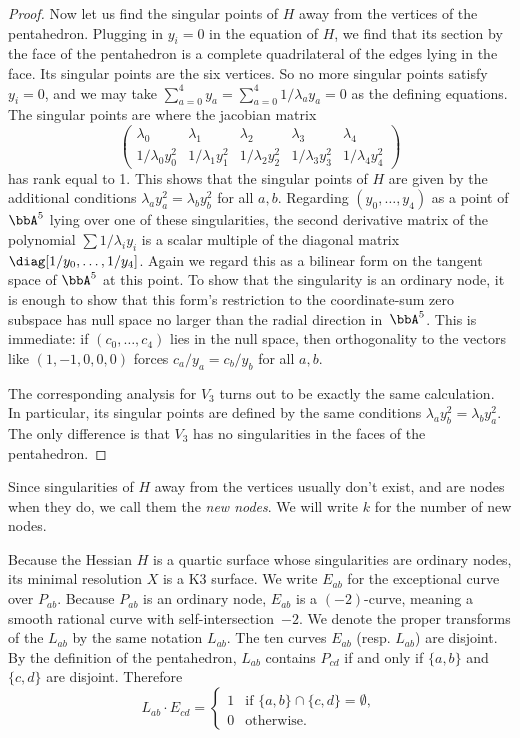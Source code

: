\begin{proof}
Now let us find the singular points of $H$ away from the vertices of the pentahedron. Plugging in $y_i = 0$ in the equation of $H$, we find that its section by the face of the pentahedron is a complete quadrilateral of the edges lying in the face. Its singular points are the six vertices. So no more singular points satisfy $y_i = 0$, and we may take $\sum_{a=0}^4y_a=\sum_{a=0}^4 1/\lambda_ay_a=0$ as the defining equations. The singular points are where the jacobian matrix
\[
\begin{pmatrix}
\lambda_0&\lambda_1&\lambda_2&\lambda_3&\lambda_4
\\
1/\lambda_0y_0^2&1/\lambda_1y_1^2&1/\lambda_2y_2^2&1/\lambda_3y_3^2&1/\lambda_4y_4^2
\end{pmatrix}
\]
has rank equal to 1. This shows that the singular points of $H$ are given by the additional conditions $\lambda_ay_a^2=\lambda_by_b^2$ for all $a,b$. Regarding $(y_0,\dots,y_4)$ as a point of $\bbA^5$ lying over one of these singularities, the second derivative matrix of the polynomial $\sum 1/\lambda_iy_i$ is a scalar multiple of the diagonal matrix $\diag[1/y_0,\dots,1/y_4]$. Again we regard this as a bilinear form on the tangent space of $\bbA^5$ at this point. To show that the singularity is an ordinary node, it is enough to show that this form's restriction to the coordinate-sum zero subspace has null space no larger than the radial direction in~$\bbA^5$. This is immediate: if $(c_0,\dots,c_4)$ lies in the null space, then orthogonality to the vectors like $(1,-1,0,0,0)$ forces $c_a/y_a=c_b/y_b$ for all $a,b$.

The corresponding analysis for $V_3$ turns out to be exactly the same calculation. In particular, its singular points are defined by the same conditions $\lambda_ay_b^2=\lambda_by_a^2$. The only difference is that $V_3$ has no singularities in the faces of the pentahedron.
\end{proof}

Since singularities of $H$ away from the vertices usually don't exist, and are nodes when they do, we call them the \emph{new nodes}. We will write $k$ for the number of new nodes.

Because the Hessian $H$ is a quartic surface whose singularities are ordinary nodes, its minimal resolution $X$ is a K3 surface. We write $E_{ab}$ for the exceptional curve over $P_{ab}$. Because $P_{ab}$ is an ordinary node, $E_{ab}$ is a $(-2)$-curve, meaning a smooth rational curve with self-intersection~$-2$. We denote the proper transforms of the $L_{ab}$ by the same notation $L_{ab}$. The ten curves $E_{ab}$ (resp. $L_{ab}$) are disjoint. By the definition of the pentahedron, $L_{ab}$ contains $P_{cd}$ if and only if $\{a,b\}$ and $\{c,d\}$ are disjoint. Therefore
\begin{equation}\label{intersection}
L_{ab}\cdot E_{cd} =
\begin{cases}
1&\text{if }\{a,b\}\cap \{c,d\} = \emptyset,\\
0&\text{otherwise.}
\end{cases}
\end{equation}

